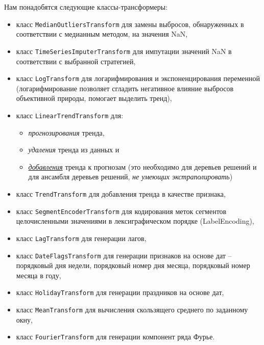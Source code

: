 \documentclass[%
	11pt,
	a4paper,
	utf8,
		]{article}
\begin{document}
Нам понадобятся следующие классы-трансформеры:
\begin{itemize}
	\item класс \verb|MedianOutliersTransform| для замены выбросов, обнаруженных в соответствии с медианным методом, на значения NaN,
	
	\item класс \verb|TimeSeriesImputerTransform| для импутации значений NaN в соответствии с выбранной стратегией,
	
	\item класс \verb|LogTransform| для логарифмирования и экспоненцирования переменной (логарифмирование позволяет сгладить негативное влияние выбросов объективной природы, помогает выделить тренд),
	
	\item класс \verb|LinearTrendTransform| для:
	\begin{itemize}
		\item \emph{прогнозирования} тренда,
		
		\item \emph{удаления} тренда из данных и
		
	   \item \emph{\underline{добавления}} тренда к прогнозам (это необходимо для деревьев решений и для ансамбля деревьев решений, \emph{\color{red}не умеющих экстраполировать})
    \end{itemize}
    
    \item класс \verb|TrendTransform| для добавления тренда в качестве признака,
    
    \item класс \verb|SegmentEncoderTransform| для кодирования меток сегментов целочисленными значениями в лексиграфическом порядке (LabelEncoding),
    
    \item класс \verb|LagTransform| для генерации лагов,
    
    \item класс \verb|DateFlagsTransform| для генерации признаков на основе дат -- порядковый дня недели, порядковый номер дня месяца, порядковый номер месяца в году,
    
    \item класс \verb|HolidayTransform| для генерации праздников на основе дат,
    
    \item класс \verb|MeanTransform| для вычисления скользящего среднего по заданному окну,
    
    \item класс \verb|FourierTransform| для генерации компонент ряда Фурье.
\end{itemize}
\end{document}
